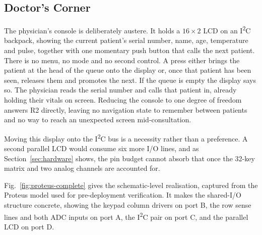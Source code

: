 \subsection{Doctor's Corner}
The physician's console is deliberately austere. It holds a $16\times2$ LCD on an
I\textsuperscript{2}C backpack, showing the current patient's serial number, name, age,
temperature and pulse, together with one momentary push button that calls the next patient.
There is no menu, no mode and no second control. A press either brings the patient at the head
of the queue onto the display or, once that patient has been seen, releases them and promotes
the next. If the queue is empty the display says so. The physician reads the serial number and calls
that patient in, already holding their vitals on screen. Reducing the console to one degree of freedom
answers R2 directly, leaving no navigation state to remember between patients and no way to reach an
unexpected screen mid-consultation.

Moving this display onto the I\textsuperscript{2}C bus is a necessity rather than a preference.
A second parallel LCD would consume six more I/O lines, and as Section~\ref{sec:hardware} shows,
the pin budget cannot absorb that once the 32-key matrix and two analog channels are accounted
for.



Fig.~\ref{fig:proteus-complete} gives the schematic-level realisation, captured from the Proteus model
used for pre-deployment verification. It makes the shared-I/O structure concrete, showing the keypad
column drivers on port B, the row sense lines and both ADC inputs on port A, the
I\textsuperscript{2}C pair on port C, and the parallel LCD on port D.
